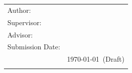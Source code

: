 \begin{titlepage}
  \centering

  \oTUM{38mm}

  \vspace{5mm}
  \begin{spacing}{1.5}
    {\huge\MakeUppercase{\getFaculty{}}}\\
  \end{spacing}

  \vspace{5mm}
  {\large\MakeUppercase{\getUniversity{}}}\\

  \vspace{20mm}
  {\Large \getDoctype{}}

  \vspace{15mm}
  {\huge\bfseries \getTitle{}}

  \vspace{10mm}
  {\huge\bfseries \getTitleGer{}}

  \vspace{10mm}
  \begin{tabular}{l l}
    Author:           & \getAuthor{}                               \\
    Supervisor:       & \getSupervisor{}                           \\
    Advisor:          & \getAdvisor{}                              \\
    Submission Date:  & \getSubmissionDate{}                       \\
    \ifdraft{Version: & \today ~(Draft)\\}{}
  \end{tabular}

\end{titlepage}
\cleardoublepage{}
